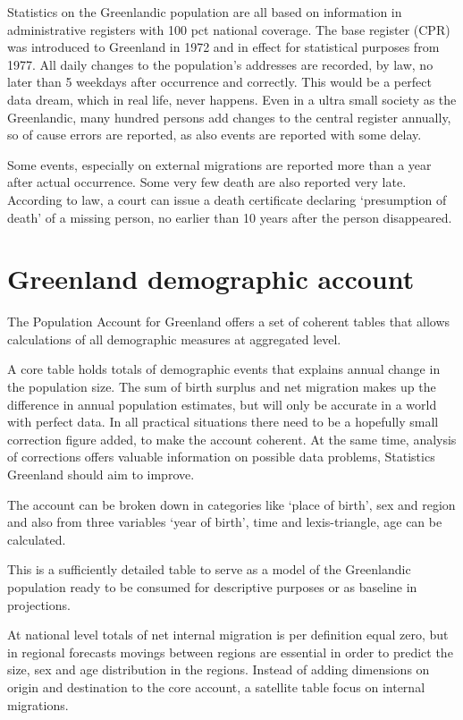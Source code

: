 \documentclass[USenglish]{article}
\begin{document}
Statistics on the Greenlandic population are all based on information in administrative registers with 100 pct national coverage. The base register (CPR) was introduced to Greenland in 1972 and in effect for statistical purposes from 1977. All daily changes to the population’s addresses are recorded, by law, no later than 5 weekdays after occurrence and correctly. This would be a perfect data dream, which in real life, never happens. Even in a ultra small society as the Greenlandic, many hundred persons add changes to the central register annually, so of cause errors are reported, as also events are reported with some delay.

Some events, especially on external migrations are reported more than a year after actual occurrence. Some very few death are also reported very late. According to law, a court can issue a death certificate declaring ‘presumption of death’ of a missing person, no earlier than 10 years after the person disappeared.



\section{Greenland demographic account}

The Population Account for Greenland offers a set of coherent tables that allows calculations of all demographic measures at aggregated level.

A core table holds totals of demographic events that  explains annual change in the population size. The sum of birth surplus and net migration makes up the difference in annual population estimates, but will only be accurate in a world with perfect data. In all practical situations there need to be a hopefully small correction figure added, to make the account coherent. At the same time, analysis of corrections offers valuable information on possible data problems, Statistics Greenland should aim to improve.

The account can be broken down in categories like ‘place of birth’, sex and region and also from three variables ‘year of birth’, time and lexis-triangle, age can be calculated. 

This is a sufficiently detailed table to serve as a model of the Greenlandic population ready to be consumed for descriptive purposes or as baseline in projections.

At national level totals of net internal migration is per definition equal zero, but in regional forecasts movings between regions are essential in order to predict the size, sex and age distribution in the regions. Instead of adding dimensions on origin and destination to the core account, a satellite table focus on internal migrations.
\end{document}
